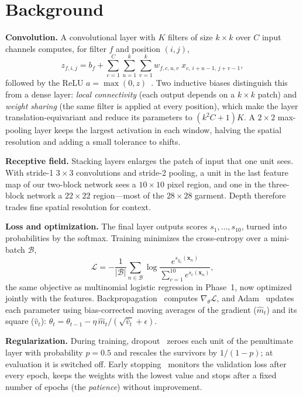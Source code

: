 \documentclass[conference]{IEEEtran}
\begin{document}
\section{Background}
\label{sec:background}
\textbf{Convolution.} A convolutional layer with $K$ filters of size $k\times k$ over $C$ input channels computes, for
filter $f$ and position $(i,j)$,
\begin{equation}
  z_{f,i,j} = b_f + \sum_{c=1}^{C}\sum_{u=1}^{k}\sum_{v=1}^{k} w_{f,c,u,v}\; x_{c,\,i+u-1,\,j+v-1},
  \label{eq:conv}
\end{equation}
followed by the ReLU $a=\max(0,z)$~\cite{nair2010rectified}. Two inductive biases distinguish this from a dense layer:
\emph{local connectivity} (each output depends on a $k\times k$ patch) and \emph{weight sharing} (the same filter is
applied at every position), which make the layer translation-equivariant and reduce its parameters to $(k^2C+1)K$.
A $2\times2$ max-pooling layer keeps the largest activation in each window, halving the spatial resolution and adding a
small tolerance to shifts.

\textbf{Receptive field.} Stacking layers enlarges the patch of input that one unit sees. With stride-1 $3\times3$
convolutions and stride-2 pooling, a unit in the last feature map of our two-block network sees a $10\times10$ pixel
region, and one in the three-block network a $22\times22$ region---most of the $28\times28$ garment. Depth therefore
trades fine spatial resolution for context.

\textbf{Loss and optimization.} The final layer outputs scores $s_1,\dots,s_{10}$, turned into probabilities by the
softmax. Training minimizes the cross-entropy over a mini-batch $\mathcal{B}$,
\begin{equation}
  \mathcal{L} = -\frac{1}{|\mathcal{B}|}\sum_{n\in\mathcal{B}} \log \frac{e^{s_{y_n}(\mathbf{x}_n)}}{\sum_{c=1}^{10} e^{s_c(\mathbf{x}_n)}},
  \label{eq:ce}
\end{equation}
the same objective as multinomial logistic regression in Phase~1, now optimized jointly with the features.
Backpropagation~\cite{rumelhart1986learning} computes $\nabla_\theta\mathcal{L}$, and Adam~\cite{kingma2015adam} updates
each parameter using bias-corrected moving averages of the gradient ($\hat m_t$) and its square ($\hat v_t$):
$\theta_t = \theta_{t-1} - \eta\, \hat m_t / (\sqrt{\hat v_t}+\epsilon)$.

\textbf{Regularization.} During training, dropout~\cite{srivastava2014dropout} zeroes each unit of the penultimate layer
with probability $p=0.5$ and rescales the survivors by $1/(1-p)$; at evaluation it is switched off. Early
stopping~\cite{prechelt1998early} monitors the validation loss after every epoch, keeps the weights with the lowest value
and stops after a fixed number of epochs (the \emph{patience}) without improvement.
\end{document}
